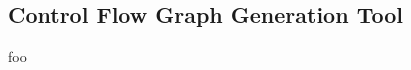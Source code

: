 
\subsection{Control Flow Graph Generation Tool}
\label{sec:control_flow_graph_generation_tool}

foo
